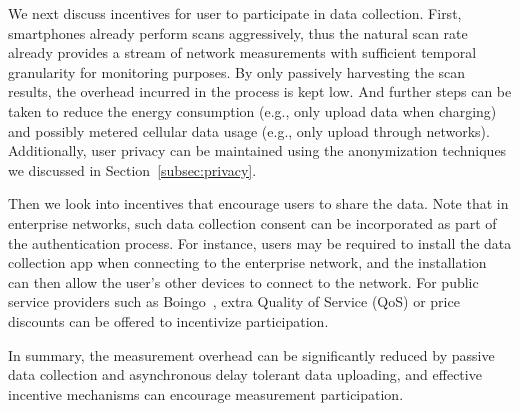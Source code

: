 We next discuss incentives for user to participate in data collection. First, smartphones already perform \wifi{}
scans aggressively, thus the natural scan rate already provides a stream of
network measurements with sufficient temporal granularity for monitoring
purposes. By only passively harvesting the scan results, the overhead incurred
in the process is kept low. And further steps can be taken to reduce the energy
consumption (e.g., only upload data when charging) and possibly metered cellular
data usage (e.g., only upload through \wifi{} networks).  Additionally, user
privacy can be maintained using the anonymization techniques we discussed in
Section~\ref{subsec:privacy}.

Then we look into incentives that encourage users to share the data. Note that
in enterprise networks, such data collection consent can be incorporated as part
of the authentication process. For instance, users may be required to install
the data collection app when connecting to the enterprise network, and the
installation can then allow the user's other devices to connect to the network.
For public \wifi{} service providers such as Boingo~\cite{boingo}, extra Quality
of Service (QoS) or price discounts can be offered to incentivize
participation.

In summary, the measurement overhead can be significantly reduced by passive
data collection and asynchronous delay tolerant data uploading, and effective
incentive mechanisms can encourage measurement participation.


